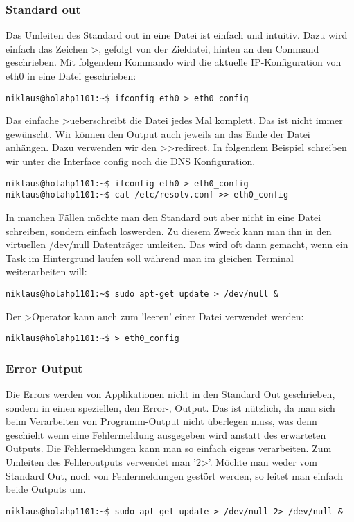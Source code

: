 \documentclass[10pt,paper=a4,final]{scrartcl}
\begin{document}
\subsubsection{Standard out}
Das Umleiten des Standard out in eine Datei ist einfach und intuitiv. Dazu wird einfach das Zeichen \textgreater, gefolgt von der Zieldatei, hinten an den Command geschrieben. Mit folgendem Kommando wird die aktuelle IP-Konfiguration von eth0 in eine Datei geschrieben:
\begin{lstlisting}[frame=single, style=shell]
niklaus@holahp1101:~$ ifconfig eth0 > eth0_config
\end{lstlisting}
Das einfache \textgreater ueberschreibt die Datei jedes Mal komplett. Das ist nicht immer gew\"unscht. Wir k\"onnen den Output auch jeweils an das Ende der Datei anh\"angen. Dazu verwenden wir den \textgreater\textgreater redirect. In folgendem Beispiel schreiben wir unter die Interface config noch die DNS Konfiguration.
\begin{lstlisting}[frame=single, style=shell]
niklaus@holahp1101:~$ ifconfig eth0 > eth0_config
niklaus@holahp1101:~$ cat /etc/resolv.conf >> eth0_config
\end{lstlisting}
In manchen F\"allen m\"ochte man den Standard out aber nicht in eine Datei schreiben, sondern einfach loswerden. Zu diesem Zweck kann man ihn in den virtuellen /dev/null Datentr\"ager umleiten. Das wird oft dann gemacht, wenn ein Task im Hintergrund laufen soll w\"ahrend man im gleichen Terminal weiterarbeiten will:
\begin{lstlisting}[frame=single, style=shell]
niklaus@holahp1101:~$ sudo apt-get update > /dev/null &
\end{lstlisting}
Der \textgreater Operator kann auch zum 'leeren' einer Datei verwendet werden:
\begin{lstlisting}[frame=single, style=shell]
niklaus@holahp1101:~$ > eth0_config
\end{lstlisting}
\subsubsection{Error Output}
Die Errors werden von Applikationen nicht in den Standard Out geschrieben, sondern in einen speziellen, den Error-, Output. Das ist n\"utzlich, da man sich beim Verarbeiten von Programm-Output nicht \"uberlegen muss, was denn geschieht wenn eine Fehlermeldung ausgegeben wird anstatt des erwarteten Outputs. Die Fehlermeldungen kann man so einfach eigens verarbeiten. Zum Umleiten des Fehleroutputs verwendet man '2\textgreater'. M\"ochte man weder vom Standard Out, noch von Fehlermeldungen gest\"ort werden, so leitet man einfach beide Outputs um.
\begin{lstlisting}[frame=single, style=shell]
niklaus@holahp1101:~$ sudo apt-get update > /dev/null 2> /dev/null &
\end{lstlisting}
\end{document}
